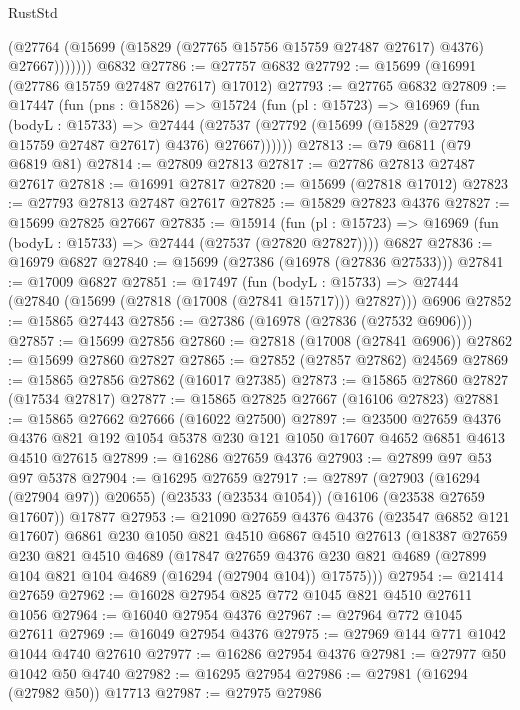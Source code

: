 \begin{lexlean}{RustStd}
\begin{coremodule}
              (@27764 (@15699 (@15829 (@27765 @15756 @15759 @27487 @27617) @4376) @27667)))))))
    @6832
@27786 := @27757 @6832
@27792 := @15699 (@16991 (@27786 @15759 @27487 @27617) @17012)
@27793 := @27765 @6832
@27809 := @17447
    (fun (pns : @15826) =>
    @15724
      (fun (pl : @15723) =>
      @16969
        (fun (bodyL : @15733) =>
        @27444 (@27537 (@27792 (@15699 (@15829 (@27793 @15759 @27487 @27617) @4376) @27667))))))
@27813 := @79 @6811 (@79 @6819 @81)
@27814 := @27809 @27813
@27817 := @27786 @27813 @27487 @27617
@27818 := @16991 @27817
@27820 := @15699 (@27818 @17012)
@27823 := @27793 @27813 @27487 @27617
@27825 := @15829 @27823 @4376
@27827 := @15699 @27825 @27667
@27835 := @15914
    (fun (pl : @15723) => @16969 (fun (bodyL : @15733) => @27444 (@27537 (@27820 @27827))))
    @6827
@27836 := @16979 @6827
@27840 := @15699 (@27386 (@16978 (@27836 @27533)))
@27841 := @17009 @6827
@27851 := @17497
    (fun (bodyL : @15733) => @27444 (@27840 (@15699 (@27818 (@17008 (@27841 @15717))) @27827)))
    @6906
@27852 := @15865 @27443
@27856 := @27386 (@16978 (@27836 (@27532 @6906)))
@27857 := @15699 @27856
@27860 := @27818 (@17008 (@27841 @6906))
@27862 := @15699 @27860 @27827
@27865 := @27852 (@27857 @27862) @24569
@27869 := @15865 @27856 @27862 (@16017 @27385)
@27873 := @15865 @27860 @27827 (@17534 @27817)
@27877 := @15865 @27825 @27667 (@16106 @27823)
@27881 := @15865 @27662 @27666 (@16022 @27500)
@27897 := @23500
    @27659
    @4376
    @4376
    @821
    @192
    @1054
    @5378
    @230
    @121
    @1050
    @17607
    @4652
    @6851
    @4613
    @4510
    @27615
@27899 := @16286 @27659 @4376
@27903 := @27899 @97 @53 @97 @5378
@27904 := @16295 @27659
@27917 := @27897
    (@27903 (@16294 (@27904 @97)) @20655)
    (@23533 (@23534 @1054))
    (@16106 (@23538 @27659 @17607))
    @17877
@27953 := @21090
    @27659
    @4376
    @4376
    (@23547 @6852 @121 @17607)
    @6861
    @230
    @1050
    @821
    @4510
    @6867
    @4510
    @27613
    (@18387
      @27659
      @230
      @821
      @4510
      @4689
      (@17847
        @27659
        @4376
        @230
        @821
        @4689
        (@27899 @104 @821 @104 @4689 (@16294 (@27904 @104)) @17575)))
@27954 := @21414 @27659
@27962 := @16028 @27954 @825 @772 @1045 @821 @4510 @27611 @1056
@27964 := @16040 @27954 @4376
@27967 := @27964 @772 @1045 @27611
@27969 := @16049 @27954 @4376
@27975 := @27969 @144 @771 @1042 @1044 @4740 @27610
@27977 := @16286 @27954 @4376
@27981 := @27977 @50 @1042 @50 @4740
@27982 := @16295 @27954
@27986 := @27981 (@16294 (@27982 @50)) @17713
@27987 := @27975 @27986

\end{coremodule}
\end{lexlean}
